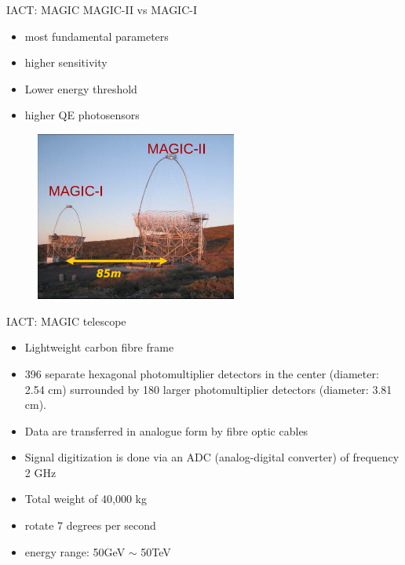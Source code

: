 \documentclass{beamer}
\begin{document}
\begin{frame}{IACT: MAGIC}
    MAGIC-II vs MAGIC-I
    \begin{itemize}
        \item most fundamental parameters
        \item higher sensitivity
        \item Lower energy threshold
        \item higher QE photosensors
    \end{itemize}

    \begin{figure}[h]
        \includegraphics[width=250px]{MAGIC_12.png}
    \end{figure}
\end{frame}


\begin{frame}{IACT: MAGIC telescope}
	\begin{itemize}
        \item Lightweight carbon fibre frame
        \item 396 separate hexagonal photomultiplier detectors in the center (diameter: 2.54 cm) surrounded by 180 larger photomultiplier detectors (diameter: 3.81 cm).
        \item Data are transferred in analogue form by fibre optic cables
        \item Signal digitization is done via an ADC (analog-digital converter) of frequency 2 GHz
        \item Total weight of 40,000 kg
        \item rotate 7 degrees per second
        \item energy range: 50GeV $\sim$ 50TeV
	\end{itemize}
\end{frame}
\end{document}
